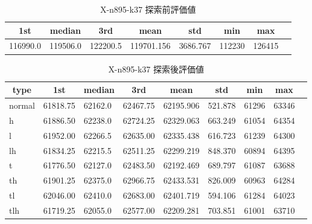 \begin{table}[htbp]
    \caption{X-n895-k37 探索前評価値}
    \begin{tabular}{|l|l|l|l|l|l|l|l|}\hline
    \multicolumn{1}{|c|}{\textbf{1st}}
    &\multicolumn{1}{c|}{\textbf{median}}
    &\multicolumn{1}{c|}{\textbf{3rd}}
    &\multicolumn{1}{c|}{\textbf{mean}}
    &\multicolumn{1}{c|}{\textbf{std}}
    &\multicolumn{1}{c|}{\textbf{min}}
    &\multicolumn{1}{c|}{\textbf{max}}\\\hline
	116990.0 & 119506.0 & 122200.5 & 119701.156 & 3686.767 & 112230 & 126415\\\hline
	\end{tabular}
\end{table}
\begin{table}[htbp]
    \caption{X-n895-k37 探索後評価値}
    \begin{tabular}{|l|l|l|l|l|l|l|l|l|}\hline
    \multicolumn{1}{|c|}{\textbf{type}}
    &\multicolumn{1}{|c|}{\textbf{1st}}
    &\multicolumn{1}{c|}{\textbf{median}}
    &\multicolumn{1}{c|}{\textbf{3rd}}
    &\multicolumn{1}{c|}{\textbf{mean}}
    &\multicolumn{1}{c|}{\textbf{std}}
    &\multicolumn{1}{c|}{\textbf{min}}
    &\multicolumn{1}{c|}{\textbf{max}}\\\hline
	normal & 61818.75 & 62162.0 & 62467.75 & 62195.906 & 521.878 & 61296 & 63346\\\hline
	h & 61886.50 & 62238.0 & 62724.25 & 62329.063 & 663.249 & 61054 & 64354\\\hline
	l & 61952.00 & 62266.5 & 62635.00 & 62335.438 & 616.723 & 61239 & 64300\\\hline
	lh & 61834.25 & 62215.5 & 62511.25 & 62299.219 & 848.370 & 60894 & 64395\\\hline
	t & 61776.50 & 62127.0 & 62483.50 & 62192.469 & 689.797 & 61087 & 63688\\\hline
	th & 61901.25 & 62375.0 & 62966.75 & 62433.531 & 826.009 & 60963 & 64284\\\hline
	tl & 62046.00 & 62410.0 & 62683.00 & 62401.719 & 594.106 & 61284 & 64023\\\hline
	tlh & 61719.25 & 62055.0 & 62577.00 & 62209.281 & 703.851 & 61001 & 63710\\\hline
	\end{tabular}
\end{table}
